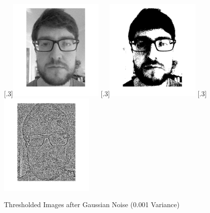 \documentclass[a4paper]{article}
\begin{document}
	\begin{figure}[H]
		\centering
		[.3\linewidth]{\includegraphics[height=5cm]{Results/Q1/d/qdVar0001.jpg}}%
		[.3\linewidth]{\includegraphics[height=5cm]{Results/Q1/d/qdThresh0001.jpg}}%
		[.3\linewidth]{\includegraphics[height=5cm]{Results/Q1/d/qd5x50001.jpg}}%
		\caption{Thresholded Images after Gaussian Noise (0.001 Variance)}
		\label{fig:}
	\end{figure}
\end{document}
